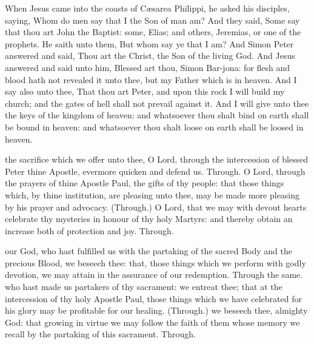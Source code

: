  When Jesus came into the coasts of C{\ae}sarea Philippi, he asked his disciples, saying, Whom do men say that I the Son of man am? And they said, Some say that thou art John the Baptist: some, Elias; and others, Jeremias, or one of the prophets. He saith unto them, But whom say ye that I am? And Simon Peter answered and said, Thou art the Christ, the Son of the living God. And Jesus answered and said unto him, Blessed art thou, Simon Bar-jona: for flesh and blood hath not revealed it unto thee, but my Father which is in heaven. And I say also unto thee, That thou art Peter, and upon this rock I will build my church; and the gates of hell shall not prevail against it. And I will give unto thee the keys of the kingdom of heaven: and whatsoever thou shalt bind on earth shall be bound in heaven: and whatsoever thou shalt loose on earth shall be loosed in heaven.


\secret
{} the sacrifice which we offer unto thee, O Lord, through the intercession of blessed Peter thine Apostle, evermore quicken and defend us. Through.
 O Lord, through the prayers of thine Apostle Paul, the gifts of thy people: that those things which, by thine institution, are pleasing unto thee, may be made more pleasing by his prayer and advocacy. (Through.)
 O Lord, that we may with devout hearts celebrate thy mysteries in honour of thy holy Martyrs: and thereby obtain an increase both of protection and joy. Through.


\postcommunion
{} our God, who hast fulfilled us with the partaking of the sacred Body and the precious Blood, we beseech thee: that, those things which we perform with godly devotion, we may attain in the assurance of our redemption. Through the same.
 who hast made us partakers of thy sacrament: we entreat thee; that at the intercession of thy holy Apostle Paul, those things which we have celebrated for his glory may be profitable for our healing. (Through.)
 we beseech thee, almighty God: that growing in virtue we may follow the faith of them whose memory we recall by the partaking of this sacrament. Through.


